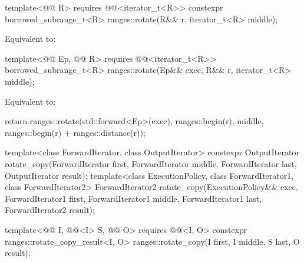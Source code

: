 \begin{itemdecl}
template<@@ R>
  requires @@<iterator_t<R>>
  constexpr borrowed_subrange_t<R> ranges::rotate(R&& r, iterator_t<R> middle);
\end{itemdecl}

\begin{itemdescr}
\pnum
\effects
Equivalent to:
\end{itemdescr}

\begin{itemdecl}
template<@@ Ep, @@ R>
  requires @@<iterator_t<R>>
  borrowed_subrange_t<R> ranges::rotate(Ep&& exec, R&& r, iterator_t<R> middle);
\end{itemdecl}

\begin{itemdescr}
\pnum
\effects
Equivalent to:
\begin{codeblock}
return ranges::rotate(std::forward<Ep>(exec), ranges::begin(r), middle,
                      ranges::begin(r) + ranges::distance(r));
\end{codeblock}
\end{itemdescr}

%
\begin{itemdecl}
template<class ForwardIterator, class OutputIterator>
  constexpr OutputIterator
    rotate_copy(ForwardIterator first, ForwardIterator middle, ForwardIterator last,
                OutputIterator result);
template<class ExecutionPolicy, class ForwardIterator1, class ForwardIterator2>
  ForwardIterator2
    rotate_copy(ExecutionPolicy&& exec,
                ForwardIterator1 first, ForwardIterator1 middle, ForwardIterator1 last,
                ForwardIterator2 result);

  template<@@ I, @@<I> S, @@ O>
    requires @@<I, O>
    constexpr ranges::rotate_copy_result<I, O>
      ranges::rotate_copy(I first, I middle, S last, O result);
\end{itemdecl}

